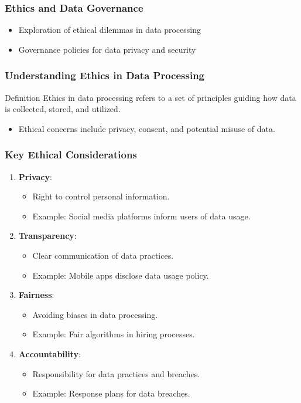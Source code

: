 \documentclass{beamer}
\begin{document}
\begin{frame}[fragile]
    \frametitle{Ethics and Data Governance}
    \begin{itemize}
        \item Exploration of ethical dilemmas in data processing
        \item Governance policies for data privacy and security
    \end{itemize}
\end{frame}

\begin{frame}[fragile]
    \frametitle{Understanding Ethics in Data Processing}
    \begin{block}{Definition}
        Ethics in data processing refers to a set of principles guiding how data is collected, stored, and utilized.
    \end{block}
    
    \begin{itemize}
        \item Ethical concerns include privacy, consent, and potential misuse of data.
    \end{itemize}
\end{frame}

\begin{frame}[fragile]
    \frametitle{Key Ethical Considerations}
    \begin{enumerate}
        \item \textbf{Privacy}:
            \begin{itemize}
                \item Right to control personal information.
                \item Example: Social media platforms inform users of data usage.
            \end{itemize}
        \item \textbf{Transparency}:
            \begin{itemize}
                \item Clear communication of data practices.
                \item Example: Mobile apps disclose data usage policy.
            \end{itemize}
        \item \textbf{Fairness}:
            \begin{itemize}
                \item Avoiding biases in data processing.
                \item Example: Fair algorithms in hiring processes.
            \end{itemize}
        \item \textbf{Accountability}:
            \begin{itemize}
                \item Responsibility for data practices and breaches.
                \item Example: Response plans for data breaches.
            \end{itemize}
    \end{enumerate}
\end{frame}
\end{document}
